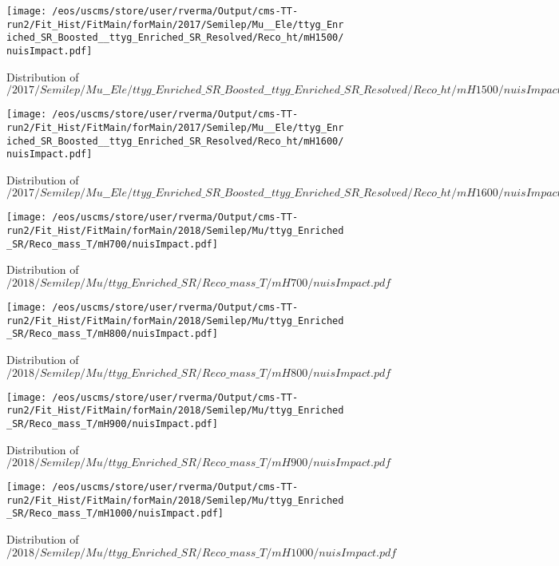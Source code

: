 \begin{figure}
\centering
\texttt{[image: /eos/uscms/store/user/rverma/Output/cms-TT-run2/Fit\_Hist/FitMain/forMain/2017/Semilep/Mu\_\_Ele/ttyg\_Enriched\_SR\_Boosted\_\_ttyg\_Enriched\_SR\_Resolved/Reco\_ht/mH1500/nuisImpact.pdf]}
\caption{Distribution of $/2017/Semilep/Mu\_\_Ele/ttyg\_Enriched\_SR\_Boosted\_\_ttyg\_Enriched\_SR\_Resolved/Reco\_ht/mH1500/nuisImpact.pdf$}
\end{figure}

\begin{figure}
\centering
\texttt{[image: /eos/uscms/store/user/rverma/Output/cms-TT-run2/Fit\_Hist/FitMain/forMain/2017/Semilep/Mu\_\_Ele/ttyg\_Enriched\_SR\_Boosted\_\_ttyg\_Enriched\_SR\_Resolved/Reco\_ht/mH1600/nuisImpact.pdf]}
\caption{Distribution of $/2017/Semilep/Mu\_\_Ele/ttyg\_Enriched\_SR\_Boosted\_\_ttyg\_Enriched\_SR\_Resolved/Reco\_ht/mH1600/nuisImpact.pdf$}
\end{figure}

\begin{figure}
\centering
\texttt{[image: /eos/uscms/store/user/rverma/Output/cms-TT-run2/Fit\_Hist/FitMain/forMain/2018/Semilep/Mu/ttyg\_Enriched\_SR/Reco\_mass\_T/mH700/nuisImpact.pdf]}
\caption{Distribution of $/2018/Semilep/Mu/ttyg\_Enriched\_SR/Reco\_mass\_T/mH700/nuisImpact.pdf$}
\end{figure}

\begin{figure}
\centering
\texttt{[image: /eos/uscms/store/user/rverma/Output/cms-TT-run2/Fit\_Hist/FitMain/forMain/2018/Semilep/Mu/ttyg\_Enriched\_SR/Reco\_mass\_T/mH800/nuisImpact.pdf]}
\caption{Distribution of $/2018/Semilep/Mu/ttyg\_Enriched\_SR/Reco\_mass\_T/mH800/nuisImpact.pdf$}
\end{figure}

\begin{figure}
\centering
\texttt{[image: /eos/uscms/store/user/rverma/Output/cms-TT-run2/Fit\_Hist/FitMain/forMain/2018/Semilep/Mu/ttyg\_Enriched\_SR/Reco\_mass\_T/mH900/nuisImpact.pdf]}
\caption{Distribution of $/2018/Semilep/Mu/ttyg\_Enriched\_SR/Reco\_mass\_T/mH900/nuisImpact.pdf$}
\end{figure}

\begin{figure}
\centering
\texttt{[image: /eos/uscms/store/user/rverma/Output/cms-TT-run2/Fit\_Hist/FitMain/forMain/2018/Semilep/Mu/ttyg\_Enriched\_SR/Reco\_mass\_T/mH1000/nuisImpact.pdf]}
\caption{Distribution of $/2018/Semilep/Mu/ttyg\_Enriched\_SR/Reco\_mass\_T/mH1000/nuisImpact.pdf$}
\end{figure}

